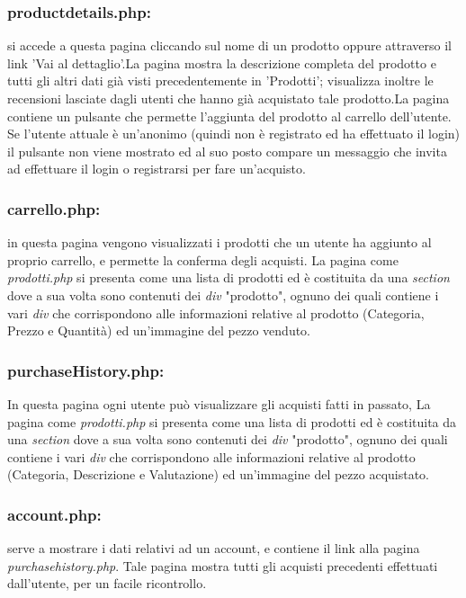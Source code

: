 \subsubsection{productdetails.php:} \Spazio si accede a questa pagina cliccando sul nome di un prodotto oppure attraverso il link 'Vai al dettaglio'.\newline La pagina mostra la descrizione completa del prodotto e tutti gli altri dati già visti precedentemente in 'Prodotti'; visualizza inoltre le recensioni lasciate dagli utenti che hanno già acquistato tale prodotto.\newline La pagina contiene un pulsante che permette l'aggiunta del prodotto al carrello dell'utente. Se l'utente attuale è un'anonimo (quindi non è registrato ed ha effettuato il login) il pulsante non viene mostrato ed al suo posto compare un messaggio che invita ad effettuare il login o registrarsi per fare un'acquisto. 

\subsubsection{carrello.php:} \Spazio in questa pagina vengono visualizzati i prodotti che un utente ha aggiunto al proprio carrello, e permette la conferma degli acquisti. La pagina come \emph{prodotti.php} si presenta come una lista di prodotti ed è costituita da una \emph{section} dove a sua volta sono contenuti dei \emph{div} "prodotto", ognuno dei quali contiene i vari \emph{div} che corrispondono alle informazioni relative al prodotto (Categoria, Prezzo e Quantità) ed un'immagine del pezzo venduto.

\subsubsection{purchaseHistory.php:} \Spazio
In questa pagina ogni utente può visualizzare gli acquisti fatti in passato, La pagina come \emph{prodotti.php} si presenta come una lista di prodotti ed è costituita da una \emph{section} dove a sua volta sono contenuti dei \emph{div} "prodotto", ognuno dei quali contiene i vari \emph{div} che corrispondono alle informazioni relative al prodotto (Categoria, Descrizione e Valutazione) ed un'immagine del pezzo acquistato.

\subsubsection{account.php:} \Spazio serve a mostrare i dati relativi ad un account, e contiene il link alla pagina \textit{purchasehistory.php}.
Tale pagina mostra tutti gli acquisti precedenti effettuati dall'utente, per un facile ricontrollo.

